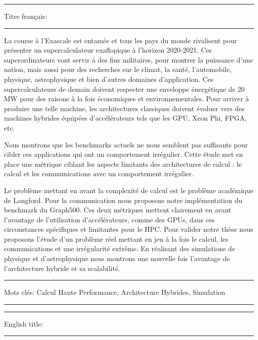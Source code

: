 \hrule
\vspace{.2cm}
Titre français: \textbf{\phdTitleFR}
\vspace{.2cm}
\hrule
\vspace{.5cm}

La course à l'Exascale est entamée et tous les pays du monde rivalisent pour présenter un supercalculateur exaflopique à l'horizon 2020-2021. 
Ces superordinateurs vont servir à des fins militaires, pour montrer la puissance d'une nation, mais aussi pour des recherches sur le climat, la santé, l'automobile, physique, astrophysique et bien d'autres domaines d'application. 
Ces supercalculateurs de demain doivent respecter une enveloppe énergétique de 20 MW pour des raisons à la fois économiques et environnementales. 
Pour arriver à produire une telle machine, les architectures classiques doivent évoluer vers des machines hybrides équipées d'accélérateurs tels que les GPU, Xeon Phi, FPGA, etc. 

Nous montrons que les benchmarks actuels ne nous semblent pas suffisants pour cibler ces applications qui ont un comportement irrégulier. 
Cette étude met en place une métrique ciblant les aspects limitants des architectures de calcul : le calcul et les communications avec un comportement irrégulier. 

Le problème mettant en avant la complexité de calcul est le problème académique de Langford. 
Pour la communication nous proposons notre implémentation du benchmark du Graph500.
Ces deux métriques mettent clairement en avant l'avantage de l'utilisation d'accélérateurs, comme des GPUs, dans ces circonstances spécifiques et limitantes pour le HPC. 
Pour valider notre thèse nous proposons l'étude d'un problème réel mettant en jeu à la fois le calcul, les communications et une irrégularité extrême. 
En réalisant des simulations de physique et d'astrophysique nous montrons une nouvelle fois l'avantage de l'architecture hybride et sa scalabilité. 

\vspace{.5cm}
\hrule
\vspace{.2cm}

{
\small
Mots clés: Calcul Haute Performance, Architecture Hybrides, Simulation
}

\vspace{.1cm}
\hrule

\vspace{1cm}
\hrule
\vspace{.2cm}
English title: \textbf{\phdTitleEN}
\vspace{.2cm}
\hrule
\vspace{.5cm}

